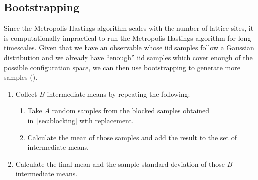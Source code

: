 	\subsection{Bootstrapping}
		Since the Metropolis-Hastings algorithm scales with the number of lattice sites, it is computationally impractical to run the Metropolis-Hastings algorithm for long timescales. Given that we have an observable whose iid samples follow a Gaussian distribution and we already have \enquote{enough} iid samples which cover enough of the possible configuration space, we can then use bootstrapping to generate more samples (\citet{bootstrap}).
		\begin{enumerate}
			\item Collect $B$ intermediate means by repeating the following:
			\begin{enumerate}
				\item Take $A$ random samples from the blocked samples obtained in~\cref{sec:blocking} with replacement.
				\item Calculate the mean of those samples and add the result to the set of intermediate means.
			\end{enumerate}
			\item Calculate the final mean and the sample standard deviation of those $B$ intermediate means.
		\end{enumerate}
